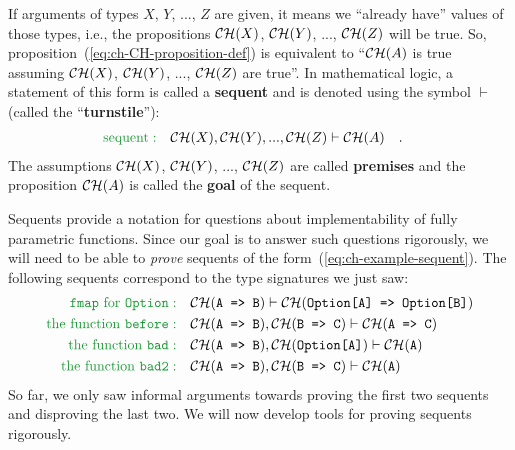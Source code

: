 If arguments of types $X$, $Y$, ..., $Z$ are given, it means we
\textsf{``}already have\textsf{''} values of those types, i.e., the propositions ${\cal CH}(X)$,
${\cal CH}(Y)$, ..., ${\cal CH}(Z)$ will be true. So, proposition~(\ref{eq:ch-CH-proposition-def})
is equivalent to \textsf{``}${\cal CH}(A)$ is true assuming ${\cal CH}(X)$,
${\cal CH}(Y)$, ..., ${\cal CH}(Z)$ are true\textsf{''}. In mathematical
logic, a statement of this form is called a \textbf{sequent} and
is denoted using the symbol $\vdash$ (called the \textsf{``}\textbf{turnstile}\textsf{''}):
\begin{align}
{\color{greenunder}\text{sequent}:}\quad & {\cal CH}(X),{\cal CH}(Y),...,{\cal CH}(Z)\vdash{\cal CH}(A)\quad.\label{eq:ch-example-sequent}
\end{align}
The assumptions ${\cal CH}(X)$, ${\cal CH}(Y)$, ..., ${\cal CH}(Z)$
are called \textbf{premises} and
the proposition ${\cal CH}(A)$ is called the \textbf{goal}
of the sequent.

Sequents provide a notation for questions about implementability of
fully parametric functions. Since our goal is to answer such questions
rigorously, we will need to be able to \emph{prove} sequents of the
form~(\ref{eq:ch-example-sequent}). The following sequents correspond
to the type signatures we just saw:
\begin{align*}
{\color{greenunder}\text{\texttt{fmap} for \texttt{Option}}:}\quad & {\cal CH}(\text{\texttt{A => B}})\vdash{\cal CH}(\text{\texttt{Option[A] => Option[B]}})\\
{\color{greenunder}\text{the function \texttt{before}}:}\quad & {\cal CH}(\text{\texttt{A => B}}),{\cal CH}(\text{\texttt{B => C}})\vdash{\cal CH}(\text{\texttt{A => C}})\\
{\color{greenunder}\text{the function }\text{\texttt{bad}}:}\quad & {\cal CH}(\text{\texttt{A => B}}),{\cal CH}(\text{\texttt{Option[A]}})\vdash{\cal CH}(\text{\texttt{A}})\\
{\color{greenunder}\text{the function }\text{\texttt{bad2}}:}\quad & {\cal CH}(\text{\texttt{A => B}}),{\cal CH}(\text{\texttt{B => C}})\vdash{\cal CH}(\text{\texttt{A}})
\end{align*}
So far, we only saw informal arguments towards proving the first two
sequents and disproving the last two. We will now develop tools for
proving sequents rigorously. 

